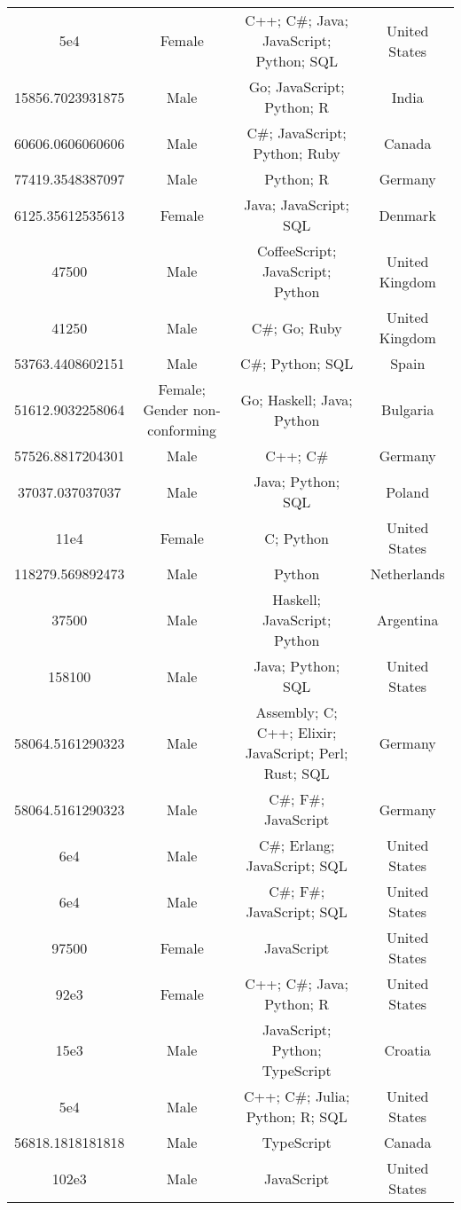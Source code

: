 \begin{center}
\begin{tabular}{ |c|c|c|c| }
5e4  &  Female  &  C++; C\#; Java; JavaScript; Python; SQL  &  United States  \\ 
15856.7023931875  &  Male  &  Go; JavaScript; Python; R  &  India  \\ 
60606.0606060606  &  Male  &  C\#; JavaScript; Python; Ruby  &  Canada  \\ 
77419.3548387097  &  Male  &  Python; R  &  Germany  \\ 
6125.35612535613  &  Female  &  Java; JavaScript; SQL  &  Denmark  \\ 
47500  &  Male  &  CoffeeScript; JavaScript; Python  &  United Kingdom  \\ 
41250  &  Male  &  C\#; Go; Ruby  &  United Kingdom  \\ 
53763.4408602151  &  Male  &  C\#; Python; SQL  &  Spain  \\ 
51612.9032258064  &  Female; Gender non-conforming  &  Go; Haskell; Java; Python  &  Bulgaria  \\ 
57526.8817204301  &  Male  &  C++; C\#  &  Germany  \\ 
37037.037037037  &  Male  &  Java; Python; SQL  &  Poland  \\ 
11e4  &  Female  &  C; Python  &  United States  \\ 
118279.569892473  &  Male  &  Python  &  Netherlands  \\ 
37500  &  Male  &  Haskell; JavaScript; Python  &  Argentina  \\ 
158100  &  Male  &  Java; Python; SQL  &  United States  \\ 
58064.5161290323  &  Male  &  Assembly; C; C++; Elixir; JavaScript; Perl; Rust; SQL  &  Germany  \\ 
58064.5161290323  &  Male  &  C\#; F\#; JavaScript  &  Germany  \\ 
6e4  &  Male  &  C\#; Erlang; JavaScript; SQL  &  United States  \\ 
6e4  &  Male  &  C\#; F\#; JavaScript; SQL  &  United States  \\ 
97500  &  Female  &  JavaScript  &  United States  \\ 
92e3  &  Female  &  C++; C\#; Java; Python; R  &  United States  \\ 
15e3  &  Male  &  JavaScript; Python; TypeScript  &  Croatia  \\ 
5e4  &  Male  &  C++; C\#; Julia; Python; R; SQL  &  United States  \\ 
56818.1818181818  &  Male  &  TypeScript  &  Canada  \\ 
102e3  &  Male  &  JavaScript  &  United States  \\ 

\end{tabular}
\end{center}
